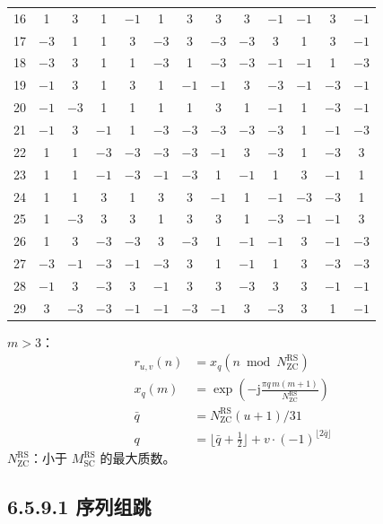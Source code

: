 \documentclass[11pt,a4paper]{ctexart}
\begin{document}
{\begin{longtable}{@{}c*{12}{@{\,}c@{\,}}@{}}
16 &  1 &  3 &  1 & $-1$ &  1 &  3 &  3 &  3 & $-1$ & $-1$ &  3 & $-1$ \\
17 & $-3$ &  1 &  1 &  3 & $-3$ &  3 & $-3$ & $-3$ &  3 &  1 &  3 & $-1$ \\
18 & $-3$ &  3 &  1 &  1 & $-3$ &  1 & $-3$ & $-3$ & $-1$ & $-1$ &  1 & $-3$ \\
19 & $-1$ &  3 &  1 &  3 &  1 & $-1$ & $-1$ &  3 & $-3$ & $-1$ & $-3$ & $-1$ \\
20 & $-1$ & $-3$ &  1 &  1 &  1 &  1 &  3 &  1 & $-1$ &  1 & $-3$ & $-1$ \\
21 & $-1$ &  3 & $-1$ &  1 & $-3$ & $-3$ & $-3$ & $-3$ & $-3$ &  1 & $-1$ & $-3$ \\
22 &  1 &  1 & $-3$ & $-3$ & $-3$ & $-3$ & $-1$ &  3 & $-3$ &  1 & $-3$ &  3 \\
23 &  1 &  1 & $-1$ & $-3$ & $-1$ & $-3$ &  1 & $-1$ &  1 &  3 & $-1$ &  1 \\
24 &  1 &  1 &  3 &  1 &  3 &  3 & $-1$ &  1 & $-1$ & $-3$ & $-3$ &  1 \\
25 &  1 & $-3$ &  3 &  3 &  1 &  3 &  3 &  1 & $-3$ & $-1$ & $-1$ &  3 \\
26 &  1 &  3 & $-3$ & $-3$ &  3 & $-3$ &  1 & $-1$ & $-1$ &  3 & $-1$ & $-3$ \\
27 & $-3$ & $-1$ & $-3$ & $-1$ & $-3$ &  3 &  1 & $-1$ &  1 &  3 & $-3$ & $-3$ \\
28 & $-1$ &  3 & $-3$ &  3 & $-1$ &  3 &  3 & $-3$ &  3 &  3 & $-1$ & $-1$ \\
29 &  3 & $-3$ & $-3$ & $-1$ & $-1$ & $-3$ & $-1$ &  3 & $-3$ &  3 &  1 & $-1$ \\
\end{longtable}
}

\textbf{$m>3$}：
\begin{align}
  r_{u,v}(n) &= x_q(n \bmod N_{\mathrm{ZC}}^{\mathrm{RS}}) \\
  x_q(m) &= \exp\!\left(-\mathrm{j}\frac{\pi q\, m(m+1)}{N_{\mathrm{ZC}}^{\mathrm{RS}}}\right) \\
  \bar{q} &= N_{\mathrm{ZC}}^{\mathrm{RS}}(u+1)/31 \\
  q &= \lfloor \bar{q} + \tfrac{1}{2}\rfloor + v\cdot(-1)^{\lfloor 2\bar{q}\rfloor}
\end{align}
$N_{\mathrm{ZC}}^{\mathrm{RS}}$：小于 $M_{\mathrm{SC}}^{\mathrm{RS}}$ 的最大质数。

\subsection{6.5.9.1 序列组跳}
\end{document}
